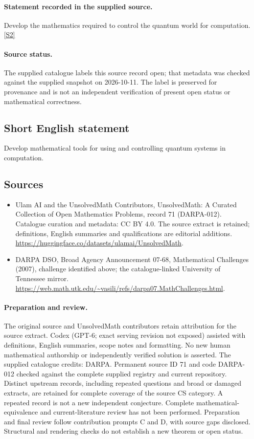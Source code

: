 \documentclass[11pt]{article}
\begin{document}
\paragraph{Statement recorded in the supplied source.}
Develop the mathematics required to control the quantum world for computation. \href{https://web.math.utk.edu/~vasili/refs/darpa07.MathChallenges.html}{[S2]}
\paragraph{Source status.}
The supplied catalogue labels this source record open; that metadata was checked against the supplied snapshot on 2026-10-11. The label is preserved for provenance and is not an independent verification of present open status or mathematical correctness.
\subsection{Short English statement}
Develop mathematical tools for using and controlling quantum systems in computation.
\subsection{Sources}
\begin{itemize}
\item[S1] Ulam AI and the UnsolvedMath Contributors, UnsolvedMath: A Curated Collection of Open Mathematics Problems, record 71 (DARPA-012). Catalogue curation and metadata: CC BY 4.0. The source extract is retained; definitions, English summaries and qualifications are editorial additions.
\url{https://huggingface.co/datasets/ulamai/UnsolvedMath}.
\item[S2] DARPA DSO, Broad Agency Announcement 07-68, Mathematical Challenges (2007), challenge identified above; the catalogue-linked University of Tennessee mirror.
\url{https://web.math.utk.edu/~vasili/refs/darpa07.MathChallenges.html}.
\end{itemize}
\paragraph{Preparation and review.}
The original source and UnsolvedMath contributors retain attribution for the source extract. Codex (GPT-6; exact serving revision not exposed) assisted with definitions, English summaries, scope notes and formatting. No new human mathematical authorship or independently verified solution is asserted. The supplied catalogue credits: DARPA. Permanent source ID 71 and code DARPA-012 checked against the complete supplied registry and current repository. Distinct upstream records, including repeated questions and broad or damaged extracts, are retained for complete coverage of the source CS category. A repeated record is not a new independent conjecture. Complete mathematical-equivalence and current-literature review has not been performed. Preparation and final review follow contribution prompts C and D, with source gaps disclosed. Structural and rendering checks do not establish a new theorem or open status.
\label{end:71}
\end{document}
